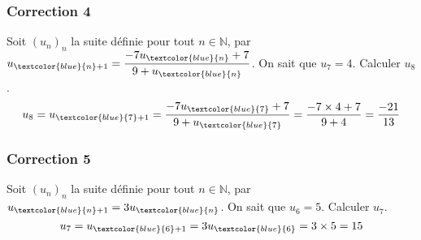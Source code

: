 \documentclass[15pt, mathserif]{beamer}
\newcommand{\N}{\mathbb{N}}			%
\begin{document}
\begin{frame}
\vspace{-10mm}
	\frametitle{Correction 4}
Soit $(u_n)_n$ la suite définie pour tout $n \in \N$, par $u_{\textcolor{blue}{n}+1}=\dfrac{-7u_{\textcolor{blue}{n}}+7}{9+u_{\textcolor{blue}{n}}}$. On sait que $u_{7}=4$. Calculer $u_{8}$. $$u_{8}=u_{\textcolor{blue}{7}+1}= \dfrac{-7u_{\textcolor{blue}{7} }+7}{9+u_{\textcolor{blue}{7} } } = \dfrac{-7\times 4+7}{9+4}=\dfrac{-21}{13}$$\end{frame}


\begin{frame}
\vspace{-10mm}
	\frametitle{Correction 5}
Soit $(u_n)_n$ la suite définie pour tout $n \in \N$, par $u_{\textcolor{blue}{n}+1}=3u_{\textcolor{blue}{n}}$. On sait que $u_{6}=5$. Calculer $u_{7}$. $$u_{7}=u_{\textcolor{blue}{6}+1}=3u_{\textcolor{blue}{6} }=3\times 5=15$$\end{frame}
\end{document}

